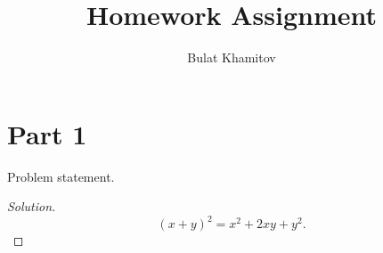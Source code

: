 \documentclass{article}[12pt]
\title{Homework Assignment}
\author{Bulat Khamitov}
\newenvironment{solution}
  {\renewcommand\qedsymbol{$\blacksquare$}\begin{proof}[Solution]}
  {\end{proof}}
\newenvironment{problem}[1]
  {\renewcommand\theinnercustomprblm{#1}\innercustomprblm}
  {\endinnercustomprblm}
\begin{document}
\maketitle

\section{Part 1}

\begin{problem}{1}
Problem statement.
\end{problem}

\begin{solution}
\[
    (x + y)^2 = x^2 + 2xy + y^2.
\]
\end{solution}
\end{document}
